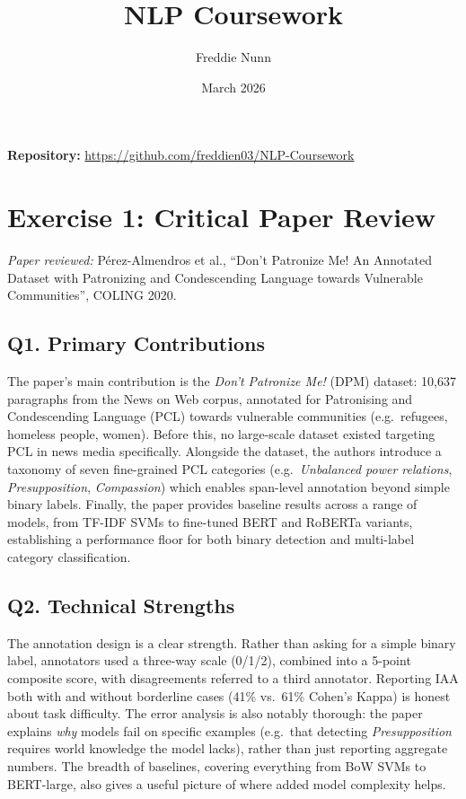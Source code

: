 \documentclass{article}
\title{NLP Coursework}
\author{Freddie Nunn}
\date{March 2026}
\begin{document}
\maketitle

\textbf{Repository:} \url{https://github.com/freddien03/NLP-Coursework}

\tableofcontents
\newpage

\section{Exercise 1: Critical Paper Review}

\noindent\textit{Paper reviewed:} Pérez-Almendros et al., ``Don't Patronize Me! An Annotated Dataset with Patronizing and Condescending Language towards Vulnerable Communities'', COLING 2020.

\subsection*{Q1. Primary Contributions}

The paper's main contribution is the \textit{Don't Patronize Me!} (DPM) dataset: 10,637 paragraphs from the News on Web corpus, annotated for Patronising and Condescending Language (PCL) towards vulnerable communities (e.g.\ refugees, homeless people, women). Before this, no large-scale dataset existed targeting PCL in news media specifically. Alongside the dataset, the authors introduce a taxonomy of seven fine-grained PCL categories (e.g.\ \textit{Unbalanced power relations}, \textit{Presupposition}, \textit{Compassion}) which enables span-level annotation beyond simple binary labels. Finally, the paper provides baseline results across a range of models, from TF-IDF SVMs to fine-tuned BERT and RoBERTa variants, establishing a performance floor for both binary detection and multi-label category classification.

\subsection*{Q2. Technical Strengths}

The annotation design is a clear strength. Rather than asking for a simple binary label, annotators used a three-way scale (0/1/2), combined into a 5-point composite score, with disagreements referred to a third annotator. Reporting IAA both with and without borderline cases (41\% vs.\ 61\% Cohen's Kappa) is honest about task difficulty. The error analysis is also notably thorough: the paper explains \textit{why} models fail on specific examples (e.g.\ that detecting \textit{Presupposition} requires world knowledge the model lacks), rather than just reporting aggregate numbers. The breadth of baselines, covering everything from BoW SVMs to BERT-large, also gives a useful picture of where added model complexity helps.
\end{document}
